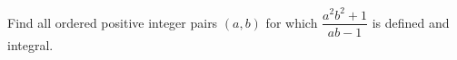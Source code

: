 Find all ordered positive integer pairs $(a,b)$ for which $\dfrac{a^2b^2+1}{ab-1}$ is defined and integral.
